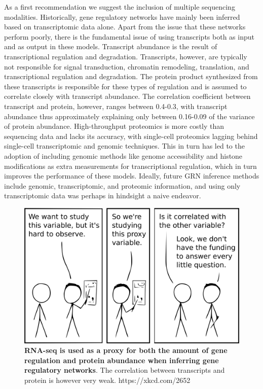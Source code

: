 As a first recommendation we suggest the inclusion of multiple sequencing modalities. Historically, gene regulatory networks have mainly been inferred based on transcriptomic data alone. Apart from the issue that these networks perform poorly\cite{McCalla_2021,Chen_2018,Pratapa_2020}, there is the fundamental issue of using transcripts both as input and as output in these models. Transcript abundance is the result of transcriptional regulation and degradation. Transcripts, however, are typically not responsible for signal transduction, chromatin remodeling, translation, and transcriptional regulation and degradation. The protein product synthesized from these transcripts is responsible for these types of regulation and is assumed to correlate closely with transcript abundance. The correlation coefficient between transcript and protein, however, ranges between 0.4-0.3\cite{Fortelny2017,Franks2017}, with transcript abundance thus approximately explaining only between 0.16-0.09 of the variance of protein abundance. High-throughput proteomics is more costly than sequencing data and lacks its accuracy, with single-cell proteomics lagging behind single-cell transcriptomic and genomic techniques\cite{Bennett2023}. This in turn has led to the adoption of including genomic methods like genome accessibility and histone modifications as extra measurements for transcriptional regulation\cite{Xu_2020,Kamal_2021,Aibar_2017}, which in turn improves the performance of these models. Ideally, future GRN inference methods include genomic, transcriptomic, and proteomic information, and using only transcriptomic data was perhaps in hindsight a naive endeavor.

\begin{figure}[H]
    \centering
    \includegraphics[width=0.7\linewidth]{ch.discussion/imgs/xkcd_proxy.png}
    \caption{\textbf{RNA-seq is used as a proxy for both the amount of gene regulation and protein abundance when inferring gene regulatory networks}. The correlation between transcripts and protein is however very weak. https://xkcd.com/2652}
    \label{fig:xkcd_proxy}
\end{figure}

